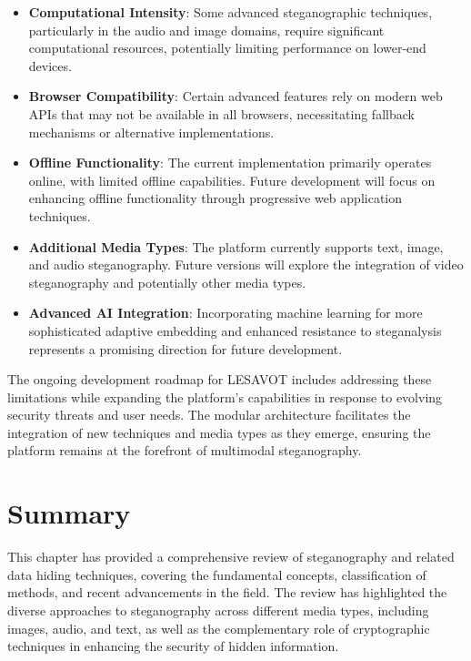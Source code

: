 \documentclass[12pt, a4paper, oneside]{book}
\begin{document}
\begin{itemize}[leftmargin=*]
    \item \textbf{Computational Intensity}: Some advanced steganographic techniques, particularly in the audio and image domains, require significant computational resources, potentially limiting performance on lower-end devices.

    \item \textbf{Browser Compatibility}: Certain advanced features rely on modern web APIs that may not be available in all browsers, necessitating fallback mechanisms or alternative implementations.

    \item \textbf{Offline Functionality}: The current implementation primarily operates online, with limited offline capabilities. Future development will focus on enhancing offline functionality through progressive web application techniques.

    \item \textbf{Additional Media Types}: The platform currently supports text, image, and audio steganography. Future versions will explore the integration of video steganography and potentially other media types.

    \item \textbf{Advanced AI Integration}: Incorporating machine learning for more sophisticated adaptive embedding and enhanced resistance to steganalysis represents a promising direction for future development.
\end{itemize}

The ongoing development roadmap for LESAVOT includes addressing these limitations while expanding the platform's capabilities in response to evolving security threats and user needs. The modular architecture facilitates the integration of new techniques and media types as they emerge, ensuring the platform remains at the forefront of multimodal steganography.

\section{Summary}
This chapter has provided a comprehensive review of steganography and related data hiding techniques, covering the fundamental concepts, classification of methods, and recent advancements in the field. The review has highlighted the diverse approaches to steganography across different media types, including images, audio, and text, as well as the complementary role of cryptographic techniques in enhancing the security of hidden information.
\end{document}
